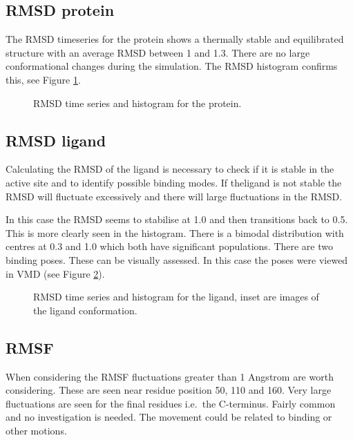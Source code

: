 \documentclass[twocolumn]{bmcart}%
\def\texttt{[image: ]}
\begin{document}
\subsection*{RMSD protein}
The RMSD timeseries for the protein shows a thermally stable and equilibrated structure with
an average RMSD between 1 and 1.3. There are no large conformational changes during the simulation. The RMSD histogram confirms this, see Figure \ref{fig:rmsdprotein}.

\begin{figure}[h!]
  \caption{
      RMSD time series and histogram for the protein.}
\label{fig:rmsdprotein}
      \end{figure}

\subsection*{RMSD ligand}
Calculating the RMSD of the ligand is necessary to check if it is stable in the active site and to identify possible binding modes. If theligand is not stable the RMSD will fluctuate excessively and there will
large fluctuations in the RMSD.

In this case the RMSD seems to stabilise at 1.0 and then transitions back to 0.5. This is more clearly seen in the histogram. There is a bimodal distribution with centres at 0.3 and 1.0 which both have significant populations. There are two binding poses. These can be visually assessed. In this case the
poses were viewed in VMD \cite{hump_vmd_1996} (see Figure \ref{fig:rmsdligand}).

\begin{figure}[h!]
  \caption{
      RMSD time series and histogram for the ligand, inset are images of the ligand conformation.}
\label{fig:rmsdligand}
      \end{figure}

\subsection*{RMSF}
When considering the RMSF fluctuations greater than 1 Angstrom are worth
considering. These are seen near residue position 50, 110 and 160. Very
large fluctuations are seen for the final residues i.e.~the C-terminus.
Fairly common and no investigation is needed. The movement could be
related to binding or other motions.
\end{document}
